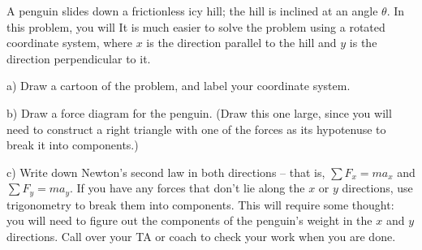 \documentclass[12pt]{article}
\begin{document}
		\Large
		\centerline{}
		\normalsize
		\centerline{}
		
		A penguin slides down a frictionless icy hill; the hill is inclined at an angle $\theta$. In this problem, you will
%		
%		
%		
%		
%		
%		
%		
%		
%		
%		
		It is much easier to solve the problem using a rotated coordinate system, where $x$ is the direction parallel to the hill and $y$ is the direction perpendicular to it.
		
		a) Draw a cartoon of the problem, and label your coordinate system.
		
		\vspace{2in}
		
		b) Draw a force diagram for the penguin. (Draw this one large, since you will need to construct a right triangle
		with one of the forces as its hypotenuse to break it into components.)
		
		\vspace{3in}
		\newpage
		c) Write down Newton's second law in both directions -- that is, $\sum F_x = ma_x$ and $\sum F_y = ma_y$.
		If you have any forces that don't lie along the $x$ or $y$ directions, use trigonometry to break them into components.
		This will require some thought: you will need to figure out the components of the
		penguin's weight in the $x$ and $y$ directions. Call over your TA or coach to check your work when you are done.
		
\end{document}
